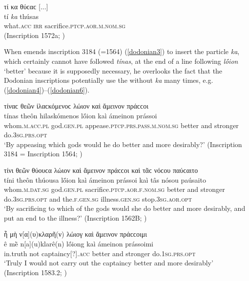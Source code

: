 \begin{exe}
\ex τί κα θύϲαϲ {[}...{]}\\
\gll tí \emph{ka} thúsas\\
what.\textsc{acc} \textsc{irr} sacrifice.\textsc{ptcp.aor.m.nom.sg}\\
\trans (Inscription 1572a; \citealp{Hoffmann1890})
\label{dodonian2}
\end{exe}

When \citet[82--83]{Blass1888} emends inscription 3184 (=1564) (\ref{dodonian3}) to insert the particle \textit{ka}, which certainly cannot have followed \textit{tínas}, at the end of a line following \textit{lṓion} `better' because it is supposedly necessary, he overlooks the fact that the Dodonian inscriptions potentially use the  without \textit{ka} many times, e.g. (\ref{dodonian4})--(\ref{dodonian6}).

\begin{exe}
\ex τίναϲ θεῶν ἱλαϲκόμενοϲ λώιον καὶ ἄμεινον πράϲϲοι\\
\gll tínas theôn hilaskómenos lṓion kaì ámeinon prássoi\\
whom.\textsc{m.acc.pl} god.\textsc{gen.pl} appease.\textsc{ptcp.prs.pass.m.nom.sg} better and stronger do.\textsc{3sg.prs.opt}\\
\trans `By appeasing which gods would he do better and more desirably?' (Inscription 3184 = Inscription 1564; \citealp{Hoffmann1890})
\label{dodonian3}
\end{exe}

\begin{exe}
\ex τίνι θεῶν θύουϲα λώιον καὶ ἄμεινον πράϲϲοι καὶ τᾶϲ νόϲου παύϲαιτο\\
\gll tíni theôn thúousa lṓion kaì ámeinon prássoi kaì tâs nósou paúsaito\\
whom.\textsc{m.dat.sg} god.\textsc{gen.pl} sacrifice.\textsc{ptcp.aor.f.nom.sg} better and stronger do.\textsc{3sg.prs.opt} and the.\textsc{f.gen.sg}
illness.\textsc{gen.sg} stop.\textsc{3sg.aor.opt}\\
\trans `By sacrificing to which of the gods would she do better and more desirably, and put an end to the illness?' (Inscription 1562B; \citealp{Hoffmann1890})
\label{dodonian4}
\end{exe}

\begin{exe}
\ex ἦ μὴ ν{[α{]}(υ)κλαρῆ(ν) λώιογ καὶ ἄμεινον πράϲϲοιμι}\\
\gll ê mḕ n{[}a{]}(u)klarê(n) lṓiong kaì ámeinon prássoimi\\
in.truth not captaincy{[}?{]}.\textsc{acc} better and stronger do.\textsc{1sg.prs.opt}\\
\trans `Truly I would not carry out the captaincy better and more desirably' (Inscription 1583.2; \citealp{Hoffmann1890})
\label{dodonian5}
\end{exe}

